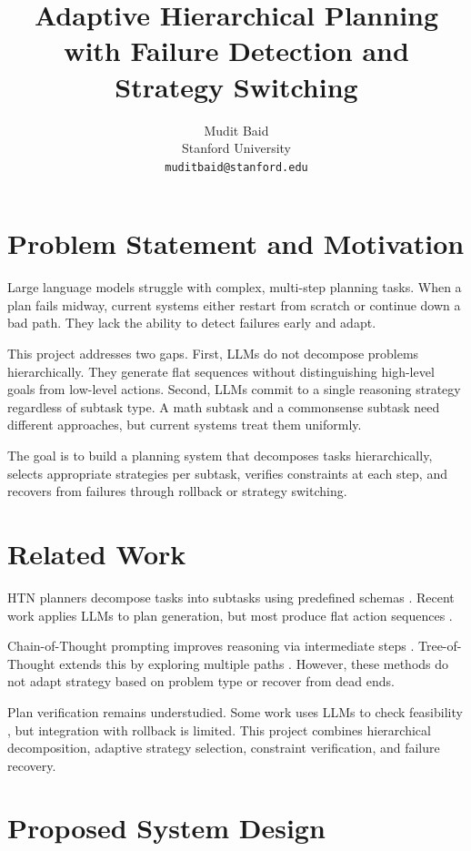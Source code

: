 \documentclass{article}
\title{Adaptive Hierarchical Planning with Failure Detection and Strategy Switching}
\author{Mudit Baid \\ Stanford University \\ \texttt{muditbaid@stanford.edu}}
\date{}
\begin{document}
\maketitle

\section{Problem Statement and Motivation}

Large language models struggle with complex, multi-step planning tasks. When a plan fails midway, current systems either restart from scratch or continue down a bad path. They lack the ability to detect failures early and adapt.

This project addresses two gaps. First, LLMs do not decompose problems hierarchically. They generate flat sequences without distinguishing high-level goals from low-level actions. Second, LLMs commit to a single reasoning strategy regardless of subtask type. A math subtask and a commonsense subtask need different approaches, but current systems treat them uniformly.

The goal is to build a planning system that decomposes tasks hierarchically, selects appropriate strategies per subtask, verifies constraints at each step, and recovers from failures through rollback or strategy switching.

\section{Related Work}

HTN planners decompose tasks into subtasks using predefined schemas \citep{erol1994htn}. Recent work applies LLMs to plan generation, but most produce flat action sequences \citep{huang2022language}.

Chain-of-Thought prompting improves reasoning via intermediate steps \citep{wei2022chain}. Tree-of-Thought extends this by exploring multiple paths \citep{yao2023tree}. However, these methods do not adapt strategy based on problem type or recover from dead ends.

Plan verification remains understudied. Some work uses LLMs to check feasibility \citep{valmeekam2023planning}, but integration with rollback is limited. This project combines hierarchical decomposition, adaptive strategy selection, constraint verification, and failure recovery.

\section{Proposed System Design}
\end{document}
